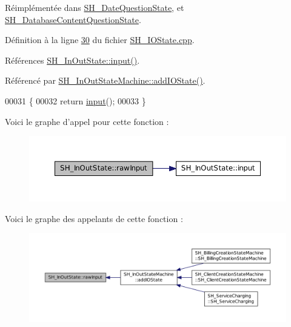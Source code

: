 Réimplémentée dans \hyperlink{classSH__DateQuestionState_ac72e5b6b416614631032ff643d3c180e}{S\-H\-\_\-\-Date\-Question\-State}, et \hyperlink{classSH__DatabaseContentQuestionState_a344d9109e15509506b1b998d28392cac}{S\-H\-\_\-\-Database\-Content\-Question\-State}.



Définition à la ligne \hyperlink{SH__IOState_8cpp_source_l00030}{30} du fichier \hyperlink{SH__IOState_8cpp_source}{S\-H\-\_\-\-I\-O\-State.\-cpp}.



Références \hyperlink{classSH__InOutState_a04364c76d2fd8a3781e7b325955e5bd9}{S\-H\-\_\-\-In\-Out\-State\-::input()}.



Référencé par \hyperlink{classSH__InOutStateMachine_ad6b778d052f741daee720c047059ce0e}{S\-H\-\_\-\-In\-Out\-State\-Machine\-::add\-I\-O\-State()}.


\begin{DoxyCode}
00031 \{
00032     \textcolor{keywordflow}{return} \hyperlink{classSH__InOutState_a04364c76d2fd8a3781e7b325955e5bd9}{input}();
00033 \}
\end{DoxyCode}


Voici le graphe d'appel pour cette fonction \-:\nopagebreak
\begin{figure}[H]
\begin{center}
\leavevmode
\includegraphics[width=350pt]{classSH__InOutState_a4b1ca094de91c47690ec2d1e95678273_cgraph}
\end{center}
\end{figure}




Voici le graphe des appelants de cette fonction \-:\nopagebreak
\begin{figure}[H]
\begin{center}
\leavevmode
\includegraphics[width=350pt]{classSH__InOutState_a4b1ca094de91c47690ec2d1e95678273_icgraph}
\end{center}
\end{figure}


